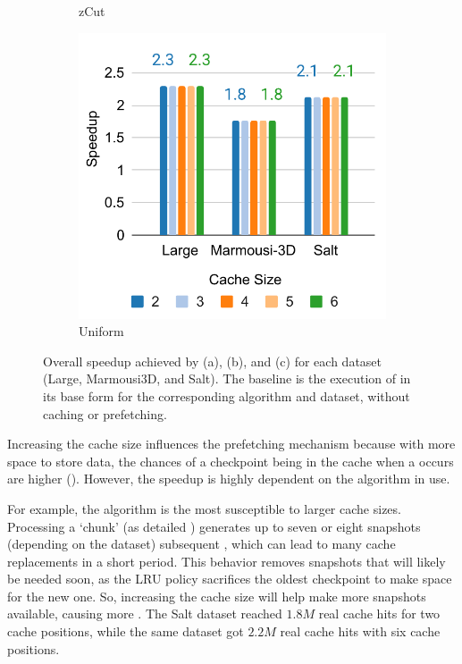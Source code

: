 \documentclass[Ingles]{ic-tese-v3}
\begin{document}
\begin{figure}[h!]
\begin{subfigure}[b]{0.33\textwidth}
        \caption{zCut}
        \label{fig:prefetch_speedup_zcut}
    \end{subfigure}
    \hfill
    \begin{subfigure}[b]{0.32\textwidth}
        \includegraphics[width=\textwidth]{figures/prefetch_speedup/prefetch_speedup_uniform.pdf}
        \caption{Uniform}
        \label{fig:prefetch_speedup_uniform}
    \end{subfigure}
    
    \caption[Overall speedup (\checkpointprefetching)]{Overall speedup achieved by \revolve (a), \zcut (b), and \uniform (c) for each dataset (Large, Marmousi3D, and Salt). The baseline is the execution of \awave in its base form for the corresponding algorithm and dataset, without caching or prefetching.}
    \label{fig:prefetch_speedup}
\end{figure}

Increasing the cache size influences the prefetching mechanism because with more space to store \checkpointing data, the chances of a checkpoint being in the cache when a \restore occurs are higher (). However, the speedup is highly dependent on the \checkpointing algorithm in use.

For example, the \revolve algorithm is the most susceptible to larger cache sizes. Processing a `chunk' (as detailed ) generates up to seven or eight snapshots (depending on the dataset) subsequent \save, which can lead to many cache replacements in a short period. This behavior removes snapshots that will likely be needed soon, as the LRU policy sacrifices the oldest checkpoint to make space for the new one. So, increasing the cache size will help make more snapshots available, causing more . The Salt dataset reached $1.8 M$ real cache hits for two cache positions, while the same dataset got $2.2 M$ real cache hits with six cache positions.
\end{document}
